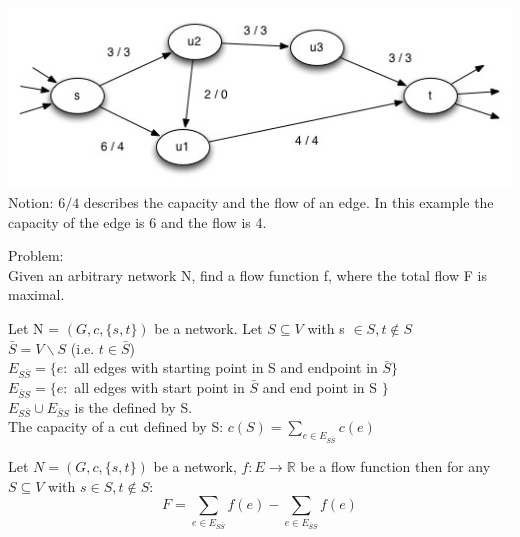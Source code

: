 \begin{example}
\includegraphics{diagrams/Chapter3_Example1.jpg}
\\Notion: $ 6 / 4 $ describes the capacity and the flow of an edge. In this example the capacity of the edge is 6 and the flow is 4.
\end{example}

Problem: \\
Given an arbitrary network N, find a flow function f, where the total flow F is maximal. \\

\begin{definition}
Let N = $(G, c, \{s, t\})$ be a network. Let $S \subseteq V$ with s $\in S, t \notin S$ \\
$\bar{S} = V \backslash S$ (i.e. $t \in \bar{S}$) \\
$E_{S\bar{S}} = \{e:$ all edges with starting point in S and endpoint in $\bar{S} \}$ \\
$E_{\bar{S}S} = \{e:$ all edges with start point in $\bar{S}$ and end point in S $\}$ \\
$E_{S\bar{S}} \cup E_{\bar{S}S} $ is the  defined by S. \\
The capacity of a cut defined by S: $c(S) = \sum_{e \in E_{S\bar{S}}}c(e)$
\end{definition}

\begin{lemma}
Let $N =(G, c, \{s, t\})$ be a network, $f: E \rightarrow \mathds{R}$ be a flow function then for any $S \subseteq V$ with $s \in S, t \notin S$: 
\[
F = \sum_{e \in E_{S\bar{S}}}f(e) - \sum_{e \in E_{\bar{S}S}} f(e)
\]
\end{lemma}

